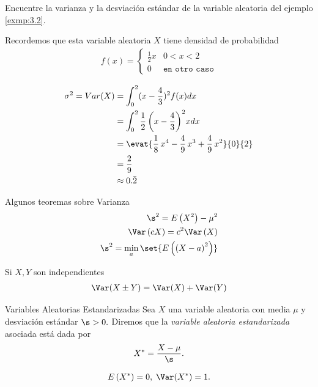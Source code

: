  \begin{ejemplo} %
  \label{exmp:3.4}
  Encuentre la varianza y la desviación estándar de la variable aleatoria del ejemplo \ref{exmp:3.2}.
 \end{ejemplo}


{}
Recordemos que esta variable aleatoria $X$ tiene densidad de probabilidad
  \begin{align*}
   f(x)=
   \begin{cases}
    \frac{1}{2}x & 0<x<2 \\
    0 & \texttt{en otro caso}
   \end{cases}
  \end{align*}

{}
\begin{align*}
 \sigma^2 = Var(X) &= \displaystyle \int_{0}^{2}(x-\frac{4}{3})^2f(x) dx
 \\  &= \displaystyle \int_{0}^{2} \frac{1}{2} \, {\left(x - \frac{4}{3}\right)}^{2} x dx
 \\  &= \displaystyle
 \evat{\frac{1}{8} \, x^{4} - \frac{4}{9} \, x^{3} + \frac{4}{9} \, x^{2}}{0}{2}
 \\  &= \displaystyle \frac{2}{9}
\\  &\approx \displaystyle 0.\bar{2}
\end{align*}

{Algunos teoremas sobre Varianza}
\begin{align}
 \label{eq:3.16}
 \s^{2}=E\left( X^{2} \right)-\mu^{2} \\ 
 \label{eq:3.17}
 \Var\left( cX \right)=c^{2}\Var\left( X \right)\\ 
 \label{thm:3.6}
 \s^{2}=\min_{a}\set{E\left( \left( X-a \right)^{2} \right)}
\end{align}

Si $X,Y$ son independientes
\begin{align}
 \label{eq:3.18}
 \Var(X\pm Y)=\Var(X)+\Var(Y)
\end{align}


{Variables Aleatorias Estandarizadas}
 Sea $X$ una variable aleatoria con media $\mu$ y desviación estándar $\s>0.$ Diremos que la \emph{variable aleatoria estandarizada} asociada está dada por
 \begin{align}
  \label{eq:3.20}
  X^{*}=\dfrac{X-\mu}{\s}.
 \end{align}


\begin{align}
 \label{eq:3.21}
 E\left( X^{*} \right)=0, \; \Var(X^{*})=1.
\end{align}


